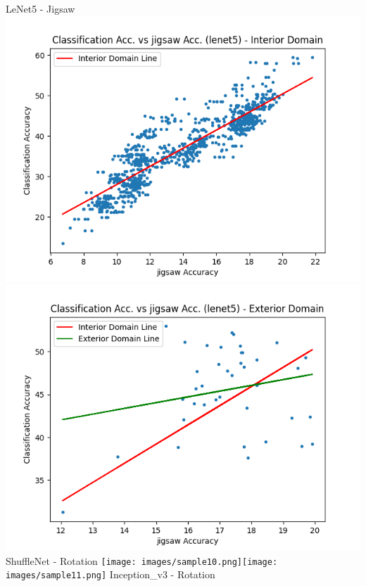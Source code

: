\documentclass[a4paper]{article}
\begin{document}
{\begin{flushleft}
    LeNet5 - Jigsaw
    \includegraphics[scale=0.16]{images/sample8.png}\includegraphics[scale=0.16]{images/sample9.png}
    ShuffleNet - Rotation
    \texttt{[image: images/sample10.png]}\texttt{[image: images/sample11.png]}
    Inception\_v3 - Rotation

\end{flushleft}}
\end{document}
